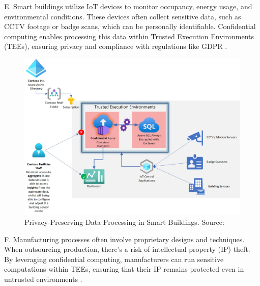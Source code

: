 \documentclass[conference]{IEEEtran}
\begin{document}
E. Smart buildings utilize IoT devices to monitor occupancy, energy usage, 
and environmental conditions. These devices often collect sensitive data, such as CCTV footage 
or badge scans, which can be personally identifiable. Confidential computing enables processing 
this data within Trusted Execution Environments (TEEs), ensuring privacy and compliance with 
regulations like GDPR \cite{azure_mpc}.

\begin{figure}[H]
\centerline{\includegraphics[width=\linewidth]{figures/iot-sensors.jpg}}
\caption{Privacy-Preserving Data Processing in Smart Buildings. Source: \cite{azure_mpc}}
\label{fig:smart_building_privacy}
\end{figure}

F. Manufacturing processes often involve proprietary designs and techniques. 
When outsourcing production, there's a risk of intellectual property (IP) theft. 
By leveraging confidential computing, manufacturers can run sensitive computations within TEEs, 
ensuring that their IP remains protected even in untrusted environments 
\cite{azure_mpc}.
\end{document}
